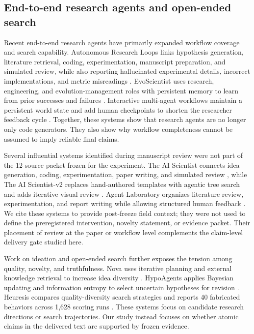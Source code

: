 \documentclass[11pt]{article}
\begin{document}
\subsection{End-to-end research agents and open-ended search}

Recent end-to-end research agents have primarily expanded workflow coverage and search capability. Autonomous Research Loops links hypothesis generation, literature retrieval, coding, experimentation, manuscript preparation, and simulated review, while also reporting hallucinated experimental details, incorrect implementations, and metric misreadings \cite{arl}. EvoScientist uses research, engineering, and evolution-management roles with persistent memory to learn from prior successes and failures \cite{evo}. Interactive multi-agent workflows maintain a persistent world state and add human checkpoints to shorten the researcher feedback cycle \cite{rethink}. Together, these systems show that research agents are no longer only code generators. They also show why workflow completeness cannot be assumed to imply reliable final claims.

Several influential systems identified during manuscript review were not part of the 12-source packet frozen for the experiment. The AI Scientist connects idea generation, coding, experimentation, paper writing, and simulated review \cite{aiscientist}, while The AI Scientist-v2 replaces hand-authored templates with agentic tree search and adds iterative visual review \cite{aiscientistv2}. Agent Laboratory organizes literature review, experimentation, and report writing while allowing structured human feedback \cite{agentlab}. We cite these systems to provide post-freeze field context; they were not used to define the preregistered intervention, novelty statement, or evidence packet. Their placement of review at the paper or workflow level complements the claim-level delivery gate studied here.

Work on ideation and open-ended search further exposes the tension among quality, novelty, and truthfulness. Nova uses iterative planning and external knowledge retrieval to increase idea diversity \cite{nova}. HypoAgents applies Bayesian updating and information entropy to select uncertain hypotheses for revision \cite{hypo}. Heuresis compares quality-diversity search strategies and reports 40 fabricated behaviors across 1,628 scoring runs \cite{heuresis}. These systems focus on candidate research directions or search trajectories. Our study instead focuses on whether atomic claims in the delivered text are supported by frozen evidence.
\end{document}
